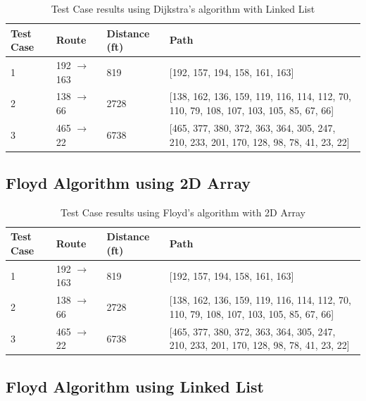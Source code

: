 \documentclass[11pt, a4paper]{article}
\begin{document}
\begin{table}[h!] %
\centering
\begin{tabular}{|l|l|l|p{8cm}|} %
\hline
\textbf{Test Case} & \textbf{Route} & \textbf{Distance (ft)} & \textbf{Path} \\ \hline
1 & 192 $\rightarrow$ 163 & 819 & [192, 157, 194, 158, 161, 163] \\ \hline
2 & 138 $\rightarrow$ 66 & 2728 & [138, 162, 136, 159, 119, 116, 114, 112, 70, 110, 79, 108, 107, 103, 105, 85, 67, 66] \\ \hline
3 & 465 $\rightarrow$ 22 & 6738 & [465, 377, 380, 372, 363, 364, 305, 247, 210, 233, 201, 170, 128, 98, 78, 41, 23, 22] \\ \hline
\end{tabular}
\caption{Test Case results using Dijkstra's algorithm with Linked List}
\label{dijll}
\end{table}

\subsection{Floyd Algorithm using 2D Array}

\begin{table}[h!] %
\centering
\begin{tabular}{|l|l|l|p{8cm}|} %
\hline
\textbf{Test Case} & \textbf{Route} & \textbf{Distance (ft)} & \textbf{Path} \\ \hline
1 & 192 $\rightarrow$ 163 & 819 & [192, 157, 194, 158, 161, 163] \\ \hline
2 & 138 $\rightarrow$ 66 & 2728 & [138, 162, 136, 159, 119, 116, 114, 112, 70, 110, 79, 108, 107, 103, 105, 85, 67, 66] \\ \hline
3 & 465 $\rightarrow$ 22 & 6738 & [465, 377, 380, 372, 363, 364, 305, 247, 210, 233, 201, 170, 128, 98, 78, 41, 23, 22] \\ \hline
\end{tabular}
\caption{Test Case results using Floyd's algorithm with 2D Array}
\label{floyd2d}
\end{table}


\subsection{Floyd Algorithm using Linked List}
\end{document}
